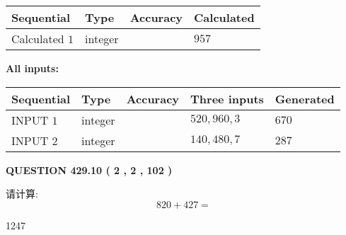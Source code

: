 \documentclass{ctexart}
\begin{document}
   
   
   
\noindent{}
   
   
  
  
\noindent\begin{tabular}{|l|l|l|l|}
\hline
 Sequential & Type & Accuracy & Calculated \\ 
\hline
 
 
  Calculated $  1 $ & integer &  & 
  $ 957 $ 
 \\  \hline  
 \end{tabular}
   
   
   
   
\noindent\vspace{0.1in}\hspace{-0.08in} {\textbf{\Large{All inputs: }}}
   
   
  
  
\noindent\begin{tabular}{|l|l|l|l|l|}
\hline
 Sequential & Type & Accuracy & Three inputs & Generated \\ 
\hline
 
 
  INPUT $  1 $ & integer &  & $
 520
 , 
 960
 , 
 3
 $ & $ 670 $ 
 \\  \hline  
 
 
  INPUT $  2 $ & integer &  & $
 140
 , 
 480
 , 
 7
 $ & $ 287 $ 
 \\  \hline  
 \end{tabular}
   
   
  
\vspace{0.2in}
  
{\textbf{\Large{QUESTION
429.10 
 ( 2 , 2 , 102 )
}}}
  
  
 
请计算:
\begin{equation}
820 +  %
427 = \nonumber
\end{equation}
 
 
 
\noindent{}
 
 

1247
 
 
\noindent{}
 
 

 
 
 
\noindent{}
 
\end{document}
